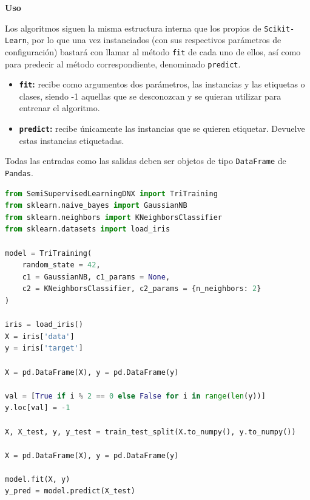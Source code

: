 \textbf{Uso}

Los algoritmos siguen la misma estructura interna que los propios de \texttt{Scikit-Learn}, por lo que una vez instanciados (con sus respectivos parámetros de configuración) bastará con llamar al método \texttt{fit} de cada uno de ellos, así como para predecir al método correspondiente, denominado \texttt{predict}.

\begin{itemize}
\item \textbf{\texttt{fit}:} recibe como argumentos dos parámetros, las instancias y las etiquetas o clases, siendo -1 aquellas que se desconozcan y se quieran utilizar para entrenar el algoritmo.
\item \textbf{\texttt{predict}:} recibe únicamente las instancias que se quieren etiquetar. Devuelve estas instancias etiquetadas.
\end{itemize}

Todas las entradas como las salidas deben ser objetos de tipo \texttt{DataFrame} de \texttt{Pandas}.

\begin{lstlisting}[language=Python, caption={Ejemplo de uso de IS-SSL}, label={lst:ejemplossl}]
from SemiSupervisedLearningDNX import TriTraining
from sklearn.naive_bayes import GaussianNB
from sklearn.neighbors import KNeighborsClassifier
from sklearn.datasets import load_iris
	
model = TriTraining(
	random_state = 42,
	c1 = GaussianNB, c1_params = None,
	c2 = KNeighborsClassifier, c2_params = {n_neighbors: 2}
)
	
iris = load_iris()
X = iris['data']
y = iris['target']

X = pd.DataFrame(X), y = pd.DataFrame(y)
	
val = [True if i % 2 == 0 else False for i in range(len(y))]
y.loc[val] = -1

X, X_test, y, y_test = train_test_split(X.to_numpy(), y.to_numpy())

X = pd.DataFrame(X), y = pd.DataFrame(y)

model.fit(X, y)
y_pred = model.predict(X_test)
	
\end{lstlisting}
\vfill
